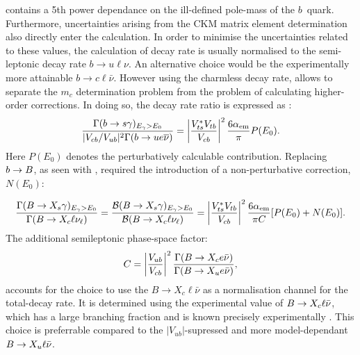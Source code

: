  contains a 5th power dependance on the ill-defined pole-mass of the $b$~quark.
Furthermore, uncertainties arising from the CKM matrix element determination also directly enter the calculation.
In order to minimise the uncertainties related to these values, the calculation of \btosgamma decay rate is usually normalised to the semi-leptonic decay rate $b\rightarrow u\ell\nu$.
An alternative choice would be the experimentally more attainable $b\rightarrow c\ell\bar{\nu}$. 
However using the charmless decay rate, allows to separate the $m_c$ determination problem from the problem of calculating higher-order corrections.
In doing so, the decay rate ratio is expressed as \cite{Gambino:2001ew}:
\begin{equation}
    \frac{\Gamma(b\rightarrow s\gamma)_{{E_{\gamma}}>E_0}}{|V_{cb}/V_{ub}|^2 \Gamma(b\rightarrow u e\overline{\nu})} = \left|\frac{V_{ts}^*V_{tb}}{V_{cb}}\right|^2 \frac{6\alpha_{\mathrm{em}}}{\pi}P(E_0).
\end{equation}
Here $P(E_0)$ denotes the perturbatively calculable contribution. 
Replacing $b\rightarrow B$, as seen with , required the introduction of a non-perturbative correction, $N(E_0)$:

\begin{equation}\label{eq:normalised_br}
    \frac{\Gamma({B\rightarrow X_{s} \gamma})_{{E_{\gamma}}>E_0}}{\Gamma(B\rightarrow X_c\ell\nu_\ell)} = \frac{\mathcal{B}({B\rightarrow X_{s} \gamma})_{{E_{\gamma}}>E_0}}{\mathcal{B}(B\rightarrow X_c\ell\nu_\ell)} = \left|\frac{V_{ts}^*V_{tb}}{V_{cb}}\right|^2\frac{6\alpha_{\mathrm{em}}}{\pi C}[P(E_0)+N(E_0)].
\end{equation}
The additional semileptonic phase-space factor:
\begin{equation}
    C = \left|\frac{V_{ub}}{V_{cb}}\right|^2 \frac{\Gamma(B\rightarrow X_ce\bar{\nu})}{\Gamma(B\rightarrow X_ue\bar{\nu})},
\end{equation}  
accounts for the choice to use the $B\rightarrow X_c\ell\bar{\nu}$ as a normalisation channel for the total-decay rate. 
It is determined using the experimental value of $B\rightarrow X_c \ell\bar{\nu}$, which has a large branching fraction and is known precisely experimentally \cite{Alberti:2014yda,Workman:2022ynf}.
This choice is preferrable compared to the $|V_{ub}|$-supressed and more model-dependant $B\rightarrow X_u\ell\bar{\nu}$.

